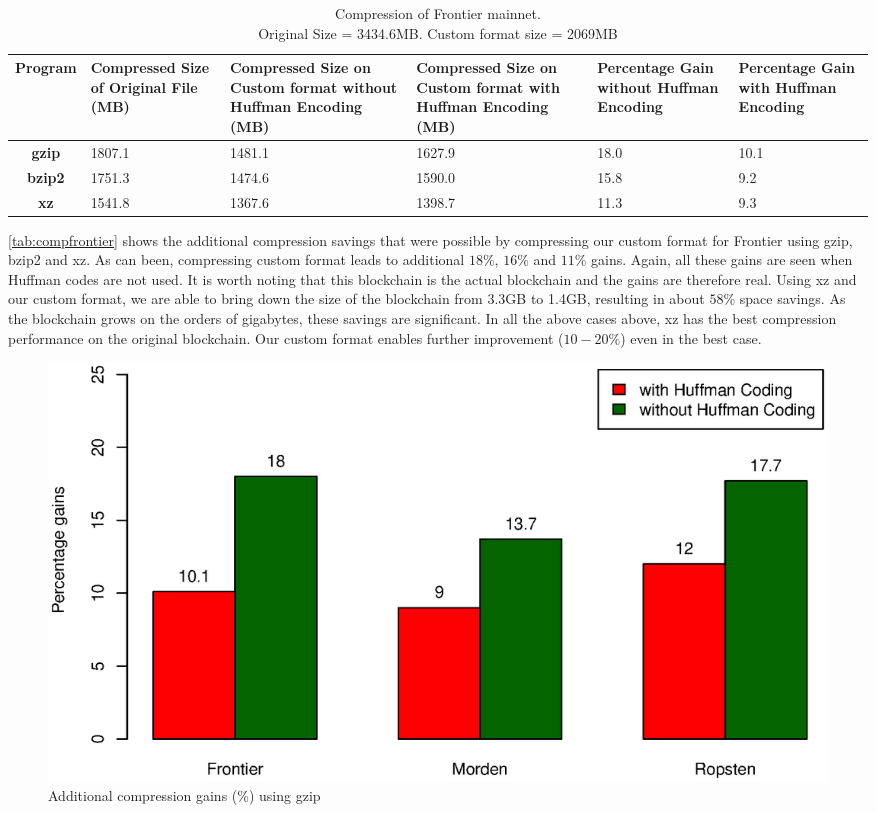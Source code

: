 \begin{table}[H]
	\centering
\captionsetup{justification=centering}
\begin{tabular}{ >{\bfseries}c| p{2cm} | p{2cm} | p{2cm} | p{1.5cm} | p{1.5cm} }
	Program & {Compressed Size of Original File (MB)} & {Compressed Size on Custom format without Huffman Encoding (MB)} & {Compressed Size on Custom format with Huffman Encoding (MB)} &Percentage Gain without Huffman Encoding & Percentage Gain with Huffman Encoding\\
  \hline
  gzip  & 1807.1 & 1481.1 & 1627.9 & 18.0 & 10.1 \\
  bzip2 & 1751.3 & 1474.6 & 1590.0 & 15.8 & 9.2 \\
  xz   & 1541.8 & 1367.6 & 1398.7 & 11.3  & 9.3 \\
\end{tabular}
\caption{Compression of Frontier mainnet. \\ Original Size = 3434.6MB. Custom format size = 2069MB}
\label{tab:compfrontier}
\end{table}
\autoref{tab:compfrontier} 
shows the additional compression savings that were possible by compressing
our custom format for Frontier  using gzip, bzip2 and xz.
As can been, compressing custom format leads to additional $18\%$, $16\%$ and $11\%$  gains. Again, all these gains are seen when
Huffman codes are not used. It is worth noting that this blockchain
is the actual \eth{} blockchain and the gains are therefore real.
Using xz and our custom format, we are able to
bring down the size of the blockchain from 3.3GB to 1.4GB,
resulting in about $58\%$ space savings.
As the blockchain grows on the orders of gigabytes, these savings are significant.
In all the above cases above, xz has the best compression performance on the original blockchain.
Our custom format enables further improvement ($10-20\%$) even in the best case.

\begin{figure}[H]
	\includegraphics[scale=0.45]{plots/gzip.eps}
	\caption{Additional compression gains (\%) using gzip}
	\label{fig:gzip}
\end{figure}

